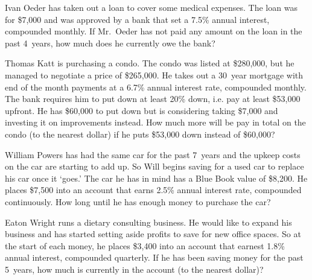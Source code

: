 \documentclass[12pt,letterpaper]{exam}
\begin{document}
\begin{questions}
\newpage
\question[10] Ivan Oeder has taken out a loan to cover some medical expenses. The loan was for \$7,000 and was approved by a bank that set a 7.5\% annual interest, compounded monthly. If Mr.~Oeder has not paid any amount on the loan in the past 4~years, how much does he currently owe the bank?



\newpage
\question[10] Thomas Katt is purchasing a condo. The condo was listed at \$280,000, but he managed to negotiate a price of \$265,000. He takes out a 30~year mortgage with end of the month payments at a 6.7\% annual interest rate, compounded monthly. The bank requires him to put down at least 20\% down, i.e. pay at least \$53,000 upfront. He has \$60,000 to put down but is considering taking \$7,000 and investing it on improvements instead. How much more will be pay in total on the condo (to the nearest dollar) if he puts \$53,000 down instead of \$60,000?



\newpage
\question[10] William Powers has had the same car for the past 7~years and the upkeep costs on the car are starting to add up. So Will begins saving for a used car to replace his car once it `goes.' The car he has in mind has a Blue Book value of \$8,200. He places \$7,500 into an account that earns 2.5\% annual interest rate, compounded continuously. How long until he has enough money to purchase the car?



\newpage
\question[10] Eaton Wright runs a dietary consulting business. He would like to expand his business and has started setting aside profits to save for new office spaces. So at the start of each money, he places \$3,400 into an account that earnest 1.8\% annual interest, compounded quarterly. If he has been saving money for the past 5~years, how much is currently in the account (to the nearest dollar)?


\end{questions}
\end{document}
